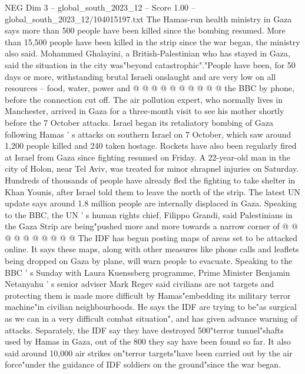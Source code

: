 \begin{textsample}{NEG Dim 3 – global\_south\_2023\_12 – Score 1.00 – global\_south\_2023\_12/104015197.txt}
The Hamas-run health ministry in Gaza says more than 500 people have been killed since the bombing resumed.
More than 15,500 people have been killed in the strip since the war began, the ministry also said.
Mohammed Ghalayini, a British-Palestinian who has stayed in Gaza, said the situation in the city was"beyond catastrophic"."People have been, for 50 days or more, withstanding brutal Israeli onslaught and are very low on all resources -- food, water, power and @ @ @ @ @ @ @ @ @ @ the BBC by phone, before the connection cut off.
The air pollution expert, who normally lives in Manchester, arrived in Gaza for a three-month visit to see his mother shortly before the 7 October attacks.
Israel began its retaliatory bombing of Gaza following Hamas ' s attacks on southern Israel on 7 October, which saw around 1,200 people killed and 240 taken hostage.
Rockets have also been regularly fired at Israel from Gaza since fighting resumed on Friday.
A 22-year-old man in the city of Holon, near Tel Aviv, was treated for minor shrapnel injuries on Saturday.
Hundreds of thousands of people have already fled the fighting to take shelter in Khan Younis, after Israel told them to leave the north of the strip.
The latest UN update says around 1.8 million people are internally displaced in Gaza.
Speaking to the BBC, the UN ' s human rights chief, Filippo Grandi, said Palestinians in the Gaza Strip are being"pushed more and more towards a narrow corner of @ @ @ @ @ @ @ @ @ @ The IDF has begun posting maps of areas set to be attacked online.
It says these maps, along with other measures like phone calls and leaflets being dropped on Gaza by plane, will warn people to evacuate.
Speaking to the BBC ' s Sunday with Laura Kuenssberg programme, Prime Minister Benjamin Netanyahu ' s senior adviser Mark Regev said civilians are not targets and protecting them is made more difficult by Hamas"embedding its military terror machine"in civilian neighbourhoods.
He says the IDF are trying to be"as surgical as we can in a very difficult combat situation", and has given advance warning of attacks.
Separately, the IDF say they have destroyed 500"terror tunnel"shafts used by Hamas in Gaza, out of the 800 they say have been found so far.
It also said around 10,000 air strikes on"terror targets"have been carried out by the air force"under the guidance of IDF soldiers on the ground"since the war began.

\end{textsample}
